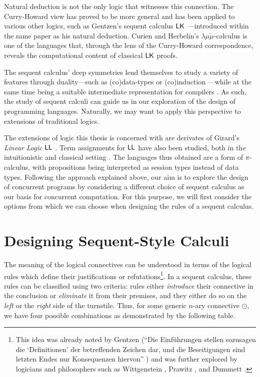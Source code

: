 Natural deduction is not the only logic that witnesses this connection. The
Curry-Howard view has proved to be more general and has been applied to various
other logics, such as Gentzen's sequent calculus $\textsf{LK}$ \cite{Gentzen1935:Untersuchungen2}---introduced within the
same paper as his natural deduction. Curien and Herbelin's $\lambda\mu\tilde{\mu}$-calculus \cite{Curien2000:DualityOfComputation}
is one of the languages that, through the lens of the Curry-Howard correspondence,
reveals the computational content of classical $\textsf{LK}$ proofs.

The sequent calculus' deep symmetries lend themselves to study a variety of
features through duality---such as (co)data-types \cite{Binder2025:Thesis} or
(co)induction \cite{Downen2015:StructuralRecursion}---while at the same time being a suitable intermediate
representation for compilers \cite{Schuster2025:AxCut}.
As such, the study of sequent calculi can guide us in our
exploration of the design of programming languages. Naturally, we may want to apply this
perspective to extensions of traditional logics.

The extensions of logic this thesis is concerned with are derivates of
Girard's \emph{Linear Logic} $\textsf{LL}$ \cite{Girard19871:LinearLogic}. Term assignments for $\textsf{LL}$ have also been studied,
both in the intuitionistic \cite{Caires2010:ILLasSessions} and classical setting \cite{Wadler2012:PropositionsAsSessions}.
The languages thus obtained are a form of $\pi$-calculus, with propositions being interpreted as session types
instead of data types. Following the approach explained above, our aim is to
explore the design of concurrent programs by considering a different choice
of sequent calculus as our basis for concurrent computation.
For this purpose, we will first consider the options from which we can choose
when designing the rules of a sequent calculus.

\section{Designing Sequent-Style Calculi}
The meaning of the logical connectives can be understood in terms of the logical rules
which define their justifications or refutations\footnote{This idea was already noted by Gentzen
(\enquote{Die Einführungen stellen sozusagen die \enquote{Definitionen} der betreffenden Zeichen dar,
und die Beseitigungen sind letzten Endes nur Konsequenzen hiervon} \cite[p. 189]{Gentzen1935:Untersuchungen1})
and was further explored by logicians and philosophers such as Wittgenstein \cite{Wittgenstein1974:PhilosophicalGrammar},
Prawitz \cite{Prawitz1974:IdeaOfAGeneralProofTheory}, and Dummett \cite{Dummett1991:LogicalBasisOfMetaphysics}.}.
In a sequent calculus, these rules
can be classified using two criteria: rules either \emph{introduce} their connective
in the conclusion or \emph{eliminate} it from their premises, and they either do so
on the \emph{left} or the \emph{right} side of the turnstile. Thus, for some generic
$n$-ary connective $\odot$, we have four possible combinations as demonstrated
by the following table.

